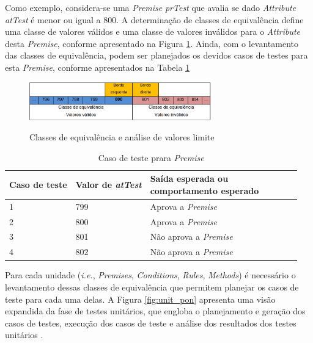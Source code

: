 Como exemplo, considera-se uma \textit{Premise} \textit{prTest} que avalia se
dado \textit{Attribute} \textit{atTest} é menor ou igual a 800. A determinação
de classes de equivalência define uma classe de valores válidos e uma classe de
valores inválidos para o \textit{Attribute} desta \textit{Premise}, conforme
apresentado na Figura \ref{fig:classe_equivalencia}. Ainda, com o levantamento
das classes de equivalência, podem ser planejados os devidos casos de testes
para esta \textit{Premise}, conforme apresentados na Tabela \ref{tab:test_case}

\begin{figure}[!htb]
  \centering
  \caption{Classes de equivalência e análise de valores limite}
  \includegraphics[width=0.7\textwidth]{../figures/classes_equivalencia.png}
  \smallskip
  \label{fig:classe_equivalencia}
\end{figure}


\begin{table}[!htb]
  \centering
  \caption{Caso de teste prara \textit{Premise}} 
  \smallskip
  \begin{tabularx}{\textwidth}{|l|*{6}{X|}}\hline
    Caso de teste & Valor de \textit{atTest} & \makecell{Saída esperada ou\\ comportamento esperado}    \\\hline
    1 & 799 & Aprova a \textit{Premise} \\ \hline
    2 & 800 & Aprova a \textit{Premise} \\ \hline
    3 & 801 & Não aprova a \textit{Premise} \\ \hline
    4 & 802 & Não aprova a \textit{Premise} \\ \hline
  \end{tabularx}
\label{tab:test_case}
\end{table}

\FloatBarrier

Para cada unidade (\textit{i.e.}, \textit{Premises}, \textit{Conditions},
\textit{Rules}, \textit{Methods}) é necessário o levantamento dessas classes de
equivalência que permitem planejar os casos de teste para cada uma delas. A
Figura \ref{fig:unit_pon} apresenta uma visão expandida da fase de testes
unitários, que engloba o planejamento e geração dos casos de testes, execução
dos casos de teste e análise dos resultados dos testes unitários
\cite{msc_Kossoski_2015}.

